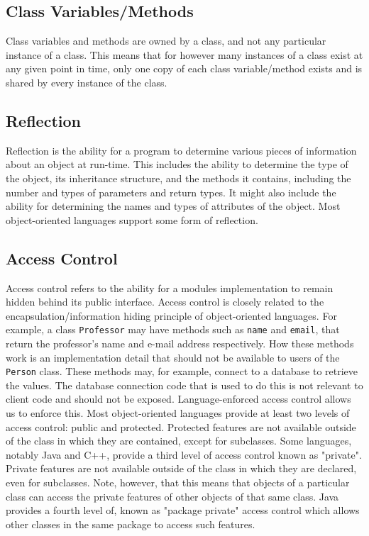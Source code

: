 \documentclass[12pt,a4paper,final,twoside,titlepage]{book}
\begin{document}
\subsection{Class Variables/Methods}
Class variables and methods are owned by a class, and not any particular instance of a class. This means that for however many instances of a class exist at any given point in time, only one copy of each class variable/method exists and is shared by every instance of the class.

\subsection{Reflection}
Reflection is the ability for a program to determine various pieces of information about an object at run-time. This includes the ability to determine the type of the object, its inheritance structure, and the methods it contains, including the number and types of parameters and return types. It might also include the ability for determining the names and types of attributes of the object. Most object-oriented languages support some form of reflection.

\subsection{Access Control}
Access control refers to the ability for a modules implementation to remain hidden behind its public interface. Access control is closely related to the encapsulation/information hiding principle of object-oriented languages. For example, a class \texttt{Professor} may have methods such as \texttt{name} and \texttt{email}, that return the professor's name and e-mail address respectively. How these methods work is an implementation detail that should not be available to users of the \texttt{Person} class. These methods may, for example, connect to a database to retrieve the values. The database connection code that is used to do this is not relevant to client code and should not be exposed. Language-enforced access control allows us to enforce this.
Most object-oriented languages provide at least two levels of access control: public and protected. Protected features are not available outside of the class in which they are contained, except for subclasses. Some languages, notably Java and C++, provide a third level of access control known as "private". Private features are not available outside of the class in which they are declared, even for subclasses. Note, however, that this means that objects of a particular class can access the private features of other objects of that same class. Java provides a fourth level of, known as "package private" access control which allows other classes in the same package to access such features.
\end{document}
